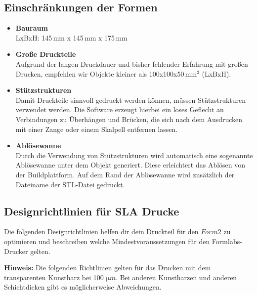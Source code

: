\documentclass{\basedir/fablab-document}
\begin{document}
	\subsection{Einschränkungen der Formen}
	\begin{itemize}
		\item \textbf{Bauraum}\\LxBxH: 145\,mm x 145\,mm x 175\,mm
		\item \textbf{Große Druckteile}\\Aufgrund der langen Druckdauer und bisher fehlender Erfahrung mit großen Drucken, empfehlen wir Objekte kleiner als 100x100x50\,$\mathrm{mm}^3$ (LxBxH).
		\item \textbf{Stützstrukturen}\\Damit Druckteile sinnvoll gedruckt werden können, müssen Stützstrukturen verwendet werden. Die Software erzeugt hierbei ein loses Geflecht an Verbindungen zu Überhängen und Brücken, die sich nach dem Ausdrucken mit einer Zange oder einem Skalpell entfernen lassen.
		\item \textbf{Ablösewanne}\\Durch die Verwendung von Stützstrukturen wird automatisch eine sogenannte Ablösewanne unter dem Objekt generiert. Diese erleichtert das Ablösen von der Buildplattform. Auf dem Rand der Ablösewanne wird zusätzlich der Dateiname der STL-Datei gedruckt.
	\end{itemize}

\subsection{Designrichtlinien für SLA Drucke}

Die folgenden Designrichtlinien helfen dir dein Druckteil für den $Form2$ zu optimieren und beschreiben welche Mindestvoraussetzungen für den Formlabs-Drucker gelten.

\textbf{Hinweis:} Die folgenden Richtlinien gelten für das Drucken mit dem transparenten Kunstharz bei 100 $\mathrm{\mu}m$. Bei anderen Kunstharzen und anderen Schichtdicken gibt es möglicherweise Abweichungen.
\end{document}
